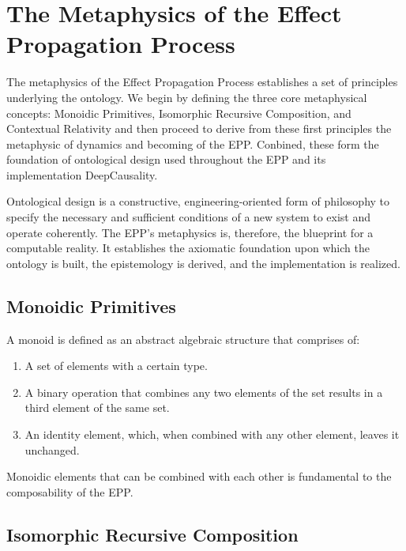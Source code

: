 \section{The Metaphysics of the Effect Propagation Process}
\label{sec:metaphysics}

The metaphysics of the Effect Propagation Process establishes a set of principles underlying the ontology. We begin by defining the three core metaphysical concepts: Monoidic Primitives, Isomorphic Recursive Composition, and Contextual Relativity and then proceed to derive from these first principles the metaphysic of dynamics and becoming of the EPP. Conbined, these form the foundation of ontological design used throughout the EPP and its implementation DeepCausality. 

Ontological design is a constructive, engineering-oriented form of philosophy to specify the necessary and sufficient conditions of a new system to exist and operate coherently. The EPP's metaphysics is, therefore, the blueprint for a computable reality. It establishes the axiomatic foundation upon which the ontology is built, the epistemology is derived, and the implementation is realized. 

\subsection{Monoidic Primitives} 
\label{sec:metaphysics_monoidic_primitives}

A monoid is defined as an abstract algebraic structure that comprises of:

\begin{enumerate}
	\item A set of elements with a certain type.
	\item A binary operation that combines any two elements of the set results in a third element of the same set.
	\item An identity element, which, when combined with any other element, leaves it unchanged.
\end{enumerate}

  Monoidic elements that can be combined with each other is fundamental to the composability of the EPP.
  
\subsection{Isomorphic Recursive Composition} 
\label{sec:metaphysics_isomorphic_recursive_composition}


